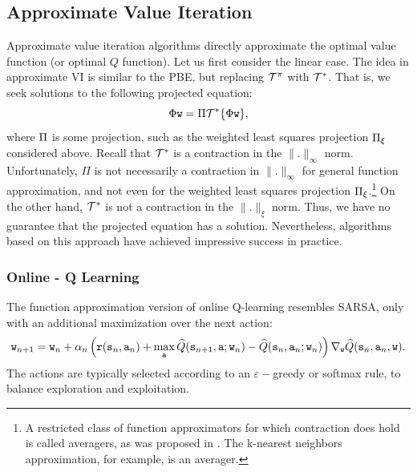 \subsection{Approximate Value Iteration}
Approximate value iteration algorithms directly approximate the optimal value function (or optimal $Q$ function). Let us first consider the linear case. The idea in approximate VI is similar to the PBE, but replacing $\mathcal{T}^\pi$ with $\mathcal{T}^*$. That is, we seek solutions to the following projected equation:
\begin{equation*}
    \Phi {\tt w} = \Pi \mathcal{T}^* \{\Phi {\tt w}\},
\end{equation*}
where $\Pi$ is some projection, such as the weighted least squares projection $\Pi_\xi$ considered above. Recall that $\mathcal{T}^*$ is a contraction in the $\|.\|_\infty$ norm. Unfortunately, $\Pi$ is not necessarily a contraction in $\|.\|_\infty$ for general function approximation, and not even for the weighted least squares projection $\Pi_\xi$.\footnote{A restricted class of function approximators for which contraction does hold is called averagers, as was proposed in \cite{gordon1995stable}. The k-nearest neighbors approximation, for example, is an averager.} On the other hand, $\mathcal{T}^*$ is not a contraction in the $\|.\|_\xi$ norm. Thus, we have no guarantee that the projected equation has a solution. Nevertheless, algorithms based on this approach have achieved impressive success in practice. 


\subsubsection{Online - Q Learning}
The function approximation version of online Q-learning resembles SARSA, only with an additional maximization over the next action:
\begin{equation*}
    {\tt w}_{n+1} = {\tt w}_n + \alpha_n \left( {\tt r}({\tt s}_n,{\tt a}_n) + \max_{\tt a} \widehat{Q}({\tt s}_{n+1},{\tt a};{\tt w}_n) - \widehat{Q}({\tt s}_{n},{\tt a}_{n}; {\tt w}_n) \right) \nabla_{{\tt w}} \widehat{Q}({\tt s}_n,{\tt a}_n,{\tt w}).
\end{equation*}
The actions are typically selected according to an $\varepsilon-$greedy or softmax rule, to balance exploration and exploitation.

